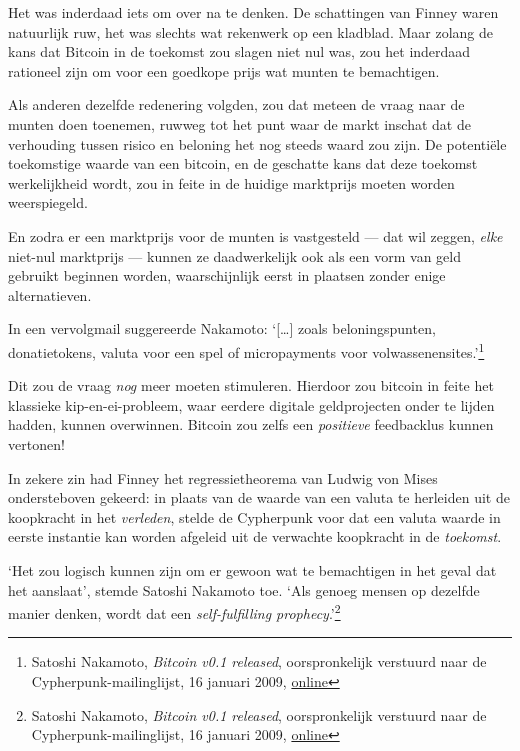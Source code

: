 \documentclass[
  a5paper,
  smalldemyvopaper,11pt,twoside,onecolumn,openright,extrafontsizes,
hidelinks]{memoir}
\begin{document}
Het was inderdaad iets om over na te denken. De schattingen van Finney
waren natuurlijk ruw, het was slechts wat rekenwerk op een kladblad.
Maar zolang de kans dat Bitcoin in de toekomst zou slagen niet nul was,
zou het inderdaad rationeel zijn om voor een goedkope prijs wat munten
te bemachtigen.

Als anderen dezelfde redenering volgden, zou dat meteen de vraag naar de
munten doen toenemen, ruwweg tot het punt waar de markt inschat dat de
verhouding tussen risico en beloning het nog steeds waard zou zijn. De
potentiële toekomstige waarde van een bitcoin, en de geschatte kans dat
deze toekomst werkelijkheid wordt, zou in feite in de huidige marktprijs
moeten worden weerspiegeld.

En zodra er een marktprijs voor de munten is vastgesteld --- dat wil
zeggen, \emph{elke} niet-nul marktprijs --- kunnen ze daadwerkelijk ook
als een vorm van geld gebruikt beginnen worden, waarschijnlijk eerst in
plaatsen zonder enige alternatieven.

In een vervolgmail suggereerde Nakamoto: `{[}\ldots{]} zoals
beloningspunten, donatietokens, valuta voor een spel of micropayments
voor volwassenensites.'\footnote{Satoshi Nakamoto, \emph{Bitcoin v0.1
  released}, oorspronkelijk verstuurd naar de Cypherpunk-mailinglijst,
  16 januari 2009,
  \href{https://www.metzdowd.com/pipermail/cryptography/2009-January/015014.html}{online}}

Dit zou de vraag \emph{nog} meer moeten stimuleren. Hierdoor zou bitcoin
in feite het klassieke kip-en-ei-probleem, waar eerdere digitale
geldprojecten onder te lijden hadden, kunnen overwinnen. Bitcoin zou
zelfs een \emph{positieve} feedbacklus kunnen vertonen!

In zekere zin had Finney het regressietheorema van Ludwig von Mises
ondersteboven gekeerd: in plaats van de waarde van een valuta te
herleiden uit de koopkracht in het \emph{verleden}, stelde de Cypherpunk
voor dat een valuta waarde in eerste instantie kan worden afgeleid uit
de verwachte koopkracht in de \emph{toekomst}.

`Het zou logisch kunnen zijn om er gewoon wat te bemachtigen in het
geval dat het aanslaat', stemde Satoshi Nakamoto toe. `Als genoeg mensen
op dezelfde manier denken, wordt dat een \emph{self-fulfilling
prophecy}.'\footnote{Satoshi Nakamoto, \emph{Bitcoin v0.1 released},
  oorspronkelijk verstuurd naar de Cypherpunk-mailinglijst, 16 januari
  2009,
  \href{https://www.metzdowd.com/pipermail/cryptography/2009-January/015014.html}{online}}
\end{document}
